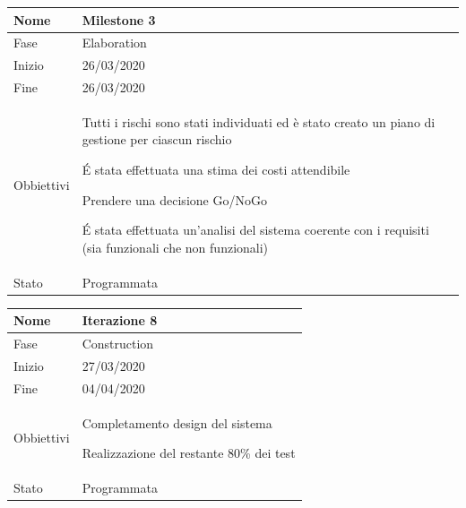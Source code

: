\begin{center}
\begin{tabular}{ |p{2cm}|p{10cm}|  }
\hline
Nome & Milestone 3\\\hline
Fase & Elaboration \\\hline
Inizio & 26/03/2020 \\\hline
Fine &  26/03/2020 \\\hline
Obbiettivi & 
	\begin{compactitem}
		\item Tutti i rischi sono stati individuati ed è stato creato un piano di gestione per ciascun rischio
		\item \'E stata effettuata una stima dei costi attendibile
		\item Prendere una decisione Go/NoGo
		\item \'E stata effettuata un'analisi del sistema coerente con i requisiti (sia funzionali che non funzionali)
	\end{compactitem}\\\hline
Stato &  Programmata \\\hline
\end{tabular}
\label{table:milestone3}\newline

\begin{tabular}{ |p{2cm}|p{10cm}|  }
\hline
Nome & Iterazione 8 \\\hline
Fase & Construction \\\hline
Inizio & 27/03/2020 \\\hline
Fine &  04/04/2020  \\\hline
Obbiettivi & 
	\begin{compactitem}
		\item Completamento design del sistema
		\item Realizzazione del restante 80\% dei test
	\end{compactitem}\\\hline
Stato &  Programmata \\\hline
\end{tabular}
\label{table:8}\newline


\end{center}
